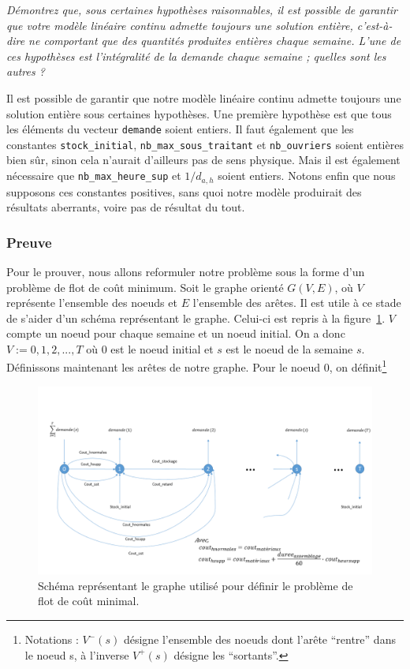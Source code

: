 \question %
\emph{Démontrez que, sous certaines hypothèses raisonnables, 
il est possible de garantir que votre modèle linéaire continu admette toujours
une solution entière, c'est-à-dire ne comportant que des quantités produites
entières chaque semaine. 
L'une de ces hypothèses est l'intégralité de la demande chaque semaine ; 
quelles sont les autres ?}

Il est possible de garantir que notre modèle linéaire continu
admette toujours une solution entière sous certaines hypothèses.
Une première hypothèse est que tous les éléments du 
vecteur \texttt{demande} soient entiers.
Il faut également que les constantes \texttt{stock\_initial}, \texttt{nb\_max\_sous\_traitant} et 
\texttt{nb\_ouvriers} soient entières bien sûr, sinon cela n'aurait d'ailleurs pas de sens physique.
Mais il est également nécessaire que \texttt{nb\_max\_heure\_sup} et $1/d_{a,h}$ soient entiers.
Notons enfin que nous supposons ces constantes positives, sans quoi notre modèle produirait des résultats aberrants,
voire pas de résultat du tout.

\subsubsection*{Preuve}
Pour le prouver, nous allons reformuler notre problème sous la forme d'un problème de flot de coût minimum.
Soit le graphe orienté $G(V,E)$, 
où $V$ représente l'ensemble des noeuds et $E$ l'ensemble des arêtes.
Il est utile à ce stade de s'aider d'un schéma représentant le graphe. 
Celui-ci est repris à la figure~\ref{fig:schemaFlot}.
$V$ compte un noeud pour chaque semaine et un noeud initial.
On a donc $V := {0, 1, 2, ..., T}$
où $0$ est le noeud initial et $s$ est le noeud de la semaine $s$.
Définissons maintenant les arêtes de notre graphe.
Pour le noeud $0$, on définit\footnote{Notations : $V^{-}(s)$ désigne l'ensemble des noeuds dont l'arête ``rentre'' dans le noeud s, à l'inverse $V^{+}(s)$ désigne les ``sortants''.}

\begin{figure}[h]
	\centering
		\includegraphics[scale = 0.45]{img/Schema_flot.png}
	\caption{Schéma représentant le graphe utilisé pour définir 
  le problème de flot de coût minimal.}
	\label{fig:schemaFlot}
\end{figure}

